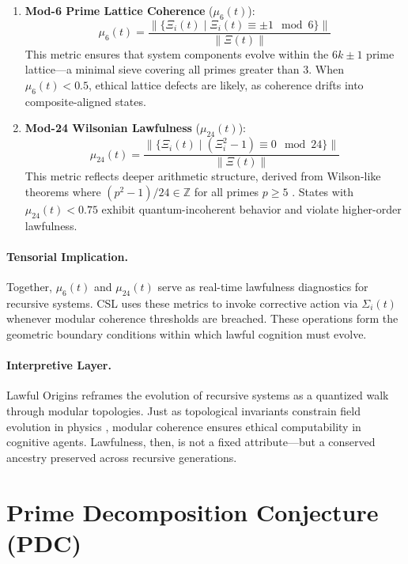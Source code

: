 \documentclass[12pt]{article}
\begin{document}
\begin{enumerate}
  \item \textbf{Mod-6 Prime Lattice Coherence} ($\mu_6(t)$):  
    \[
    \mu_6(t) = \frac{ \| \{ \Xi_i(t) \mid \Xi_i(t) \equiv \pm 1 \mod 6 \} \| }{ \|\Xi(t)\| }
    \]
    This metric ensures that system components evolve within the $6k \pm 1$ prime lattice—a minimal sieve covering all primes greater than 3. When $\mu_6(t) < 0.5$, ethical lattice defects are likely, as coherence drifts into composite-aligned states.

  \item \textbf{Mod-24 Wilsonian Lawfulness} ($\mu_{24}(t)$):  
    \[
    \mu_{24}(t) = \frac{ \| \{ \Xi_i(t) \mid (\Xi_i^2 - 1) \equiv 0 \mod 24 \} \| }{ \|\Xi(t)\| }
    \]
    This metric reflects deeper arithmetic structure, derived from Wilson-like theorems where $(p^2 - 1)/24 \in \mathbb{Z}$ for all primes $p \geq 5$ \cite{hardy2008introduction}. States with $\mu_{24}(t) < 0.75$ exhibit quantum-incoherent behavior and violate higher-order lawfulness.

\end{enumerate}

\paragraph{Tensorial Implication.}
Together, $\mu_6(t)$ and $\mu_{24}(t)$ serve as real-time lawfulness diagnostics for recursive systems. CSL uses these metrics to invoke corrective action via $\Sigma_i(t)$ whenever modular coherence thresholds are breached. These operations form the geometric boundary conditions within which lawful cognition must evolve.

\paragraph{Interpretive Layer.}
Lawful Origins reframes the evolution of recursive systems as a quantized walk through modular topologies. Just as topological invariants constrain field evolution in physics \cite{nash1983topology}, modular coherence ensures ethical computability in cognitive agents. Lawfulness, then, is not a fixed attribute—but a conserved ancestry preserved across recursive generations.

\section{Prime Decomposition Conjecture (PDC)}
\end{document}

